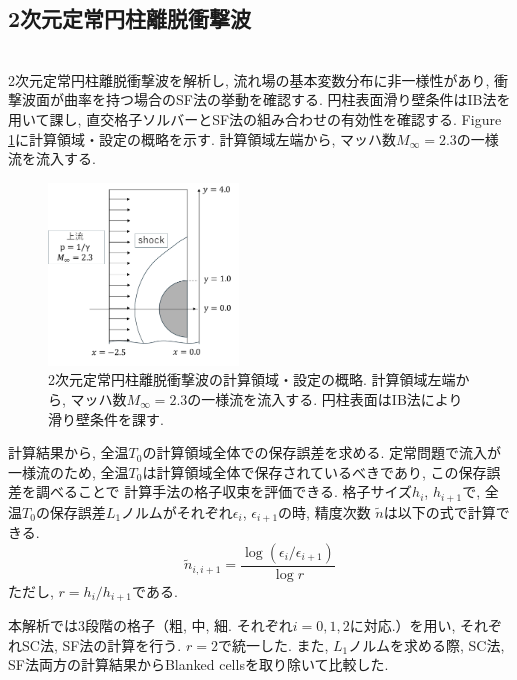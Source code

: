 \documentclass[a4j]{jarticle}
\begin{document}
\subsection{2次元定常円柱離脱衝撃波}\label{subsec:2Dcirc}
\mbox{}\\[-3.0ex]

2次元定常円柱離脱衝撃波を解析し, 流れ場の基本変数分布に非一様性があり, 衝撃波面が曲率を持つ場合のSF法の挙動を確認する.
円柱表面滑り壁条件はIB法を用いて課し, 直交格子ソルバーとSF法の組み合わせの有効性を確認する.
Figure \ref{fig:2Dcolumnsitu}に計算領域・設定の概略を示す.
計算領域左端から, マッハ数$M_\infty=2.3$の一様流を流入する.
\begin{figure}[h]
    \begin{center}
        \includegraphics[width=0.45\textwidth]{2Dcolumnsitu.pdf}
    \end{center}
    \caption{2次元定常円柱離脱衝撃波の計算領域・設定の概略.
    計算領域左端から, マッハ数$M_\infty=2.3$の一様流を流入する.
    円柱表面はIB法により滑り壁条件を課す.}
    \label{fig:2Dcolumnsitu}
\end{figure}

計算結果から, 全温$T_0$の計算領域全体での保存誤差を求める.
定常問題で流入が一様流のため, 全温$T_0$は計算領域全体で保存されているべきであり, この保存誤差を調べることで
計算手法の格子収束を評価できる. 
格子サイズ$h_i$, $h_{i+1}$で, 全温$T_0$の保存誤差$L_1$ノルムがそれぞれ$\epsilon_i$, $\epsilon_{i+1}$の時,
精度次数 $\tilde{n}$は以下の式で計算できる.
\begin{equation}
  \tilde{n}_{i,i+1} = \frac{\log (\epsilon_i/\epsilon_{i+1})}{\log r}
    \label{eq:order_of_conv}
\end{equation}
ただし, $r = h_i/h_{i+1}$である.

本解析では3段階の格子（粗, 中, 細. それぞれ$i=0,1,2$に対応.）を用い, それぞれSC法, SF法の計算を行う.
$r=2$で統一した.
また, $L_1$ノルムを求める際, SC法, SF法両方の計算結果からBlanked cellsを取り除いて比較した.
\end{document}
